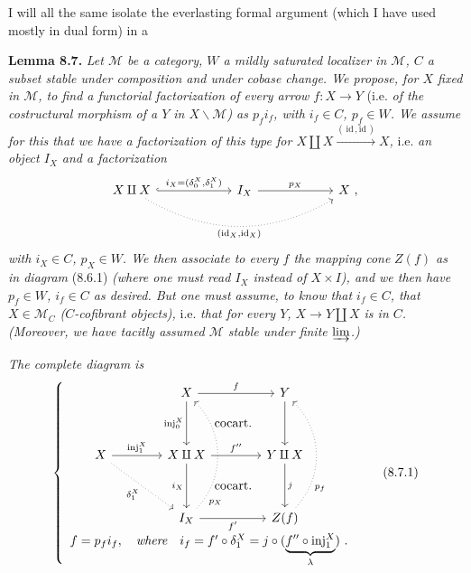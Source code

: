 \documentclass[11pt]{article}
\newcommand{\printedpage}[1]{\marginpar{\footnotesize p.~#1}}
\newcommand{\msp}[1]{\marginpar{\footnotesize [#1]}}
\begin{document}
I will all the same isolate the everlasting formal argument (which I have used mostly in dual form) in a

\textbf{Lemma 8.7.} \textit{Let $\mathcal{M}$ be a category, $W$ a mildly saturated localizer in $\mathcal{M}$, $C$ a subset stable under composition and under cobase change. We propose, for $X$ fixed in $\mathcal{M}$, to find a functorial factorization of every arrow $f : X \longrightarrow Y$} (i.e. \textit{of the costructural morphism of a $Y$ in $X\backslash\mathcal{M}$) as $p_f i_f$, with $i_f \in C$, $p_f \in W$. We assume for this that we have}
\msp{page 113}
\textit{a factorization of this type for $X \amalg X \xrightarrow{(\,\mathrm{id}\,,\mathrm{id}\,)} X$,} i.e. \textit{an object $I_X$ and a factorization}
\[
\begin{tikzcd}[column sep=6em]
X \amalg X \arrow[r, hook, "{i_X = (\delta_0^X,\delta_1^X)}"] \arrow[rr, dotted, bend right, "{(\mathrm{id}_X,\mathrm{id}_X)}"'] & I_X \arrow[r, "p_X"] & X\ ,
\end{tikzcd}
\]
\textit{with $i_X \in C$, $p_X \in W$. We then associate to every $f$ the mapping cone} \textit{$Z(f)$ as in diagram} (8.6.1) \textit{(where one must read $I_X$ instead of $X \times I$), and we then have $p_f \in W$, $i_f \in C$ as desired. But one must assume, to know that $i_f \in C$, that $X \in \mathcal{M}_C$ ($C$-cofibrant objects),} i.e. \textit{that for every $Y$, $X \longrightarrow Y \amalg X$ is in $C$. (Moreover, we have tacitly assumed $\mathcal{M}$ stable under finite $\varinjlim$.)}

\printedpage{62}

\textit{The complete diagram is}
\[
\left\{
\begin{array}{c}
\begin{tikzcd}[ampersand replacement=\&,column sep=4em,row sep=3.5em]
 \& X \arrow[r, "f"] \arrow[d, "\mathrm{inj}_0^X"'] \arrow[dr, phantom, "\text{cocart.}"] \& Y \arrow[d] \\
X \arrow[r, "\mathrm{inj}_1^X"] \arrow[dr, dotted, "\delta_1^X"'] \& X \amalg X \arrow[r, "f''"] \arrow[d, "i_X"'] \arrow[dr, phantom, "\text{cocart.}"] \& Y \amalg X \arrow[d, "j"] \\
 \& I_X \arrow[r, "f'"'] \arrow[uu, dotted, bend right=45, "p_X"{pos=.12,swap}] \& Z(f) \arrow[uu, dotted, bend right=45, "p_f"{pos=.25,swap}]
\end{tikzcd}
\\[1ex]
f = p_f i_f, \quad \textit{where} \quad i_f = f' \circ \delta_1^X = j \circ (\underbrace{f'' \circ \mathrm{inj}_1^X}_{\lambda})\ .
\end{array}
\right.
\tag*{(8.7.1)}
\]
\end{document}

